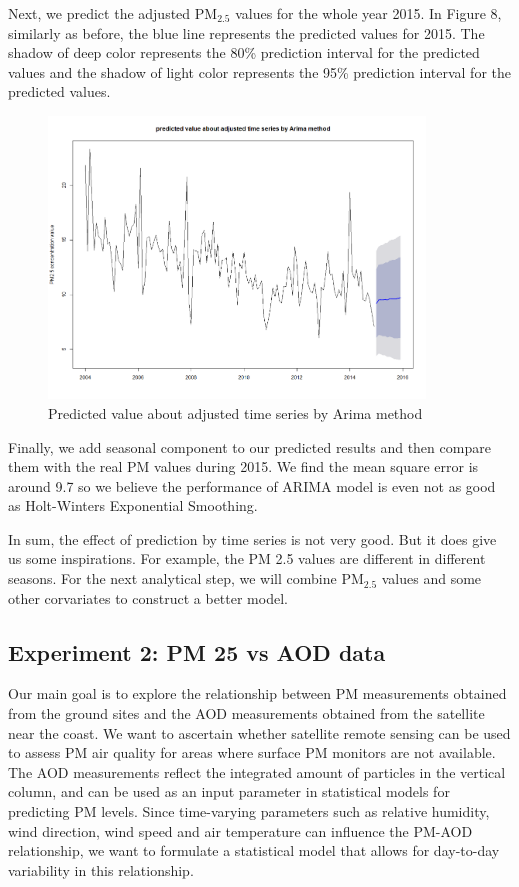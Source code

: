 \documentclass[10pt]{article}
\begin{document}
Next, we predict the adjusted PM$_{2.5}$ values for the whole year 2015. In Figure 8, similarly as before, the blue line represents the predicted values for 2015. The shadow of deep color represents the 80\% prediction interval for the predicted values and the shadow of light color represents the 95\% prediction interval for the predicted values.

\begin{figure}[H]
\centering
\includegraphics[width = 100mm]{ts6.png}
\caption{Predicted value about adjusted time series by Arima method}
\end{figure}

Finally, we add seasonal component to our predicted results and then compare them with the real PM values during 2015. We find the mean square error is around 9.7 so we believe the performance of ARIMA model is even not as good as Holt-Winters Exponential Smoothing.

In sum, the effect of prediction by time series is not very good. But it does give us some inspirations. For example, the PM 2.5 values are different in different seasons. For the next analytical step, we will combine PM$_{2.5}$ values and some other corvariates to construct a better model.

\subsection{Experiment 2: PM 25 vs AOD data}

Our main goal is to explore the relationship between PM measurements obtained from the ground sites and the AOD measurements obtained from the satellite near the coast. We want to ascertain whether satellite remote sensing can be used to assess PM air quality for areas where surface PM  monitors are not available. The AOD measurements reflect the integrated amount of particles in the vertical column, and can be used as an input parameter in statistical models for predicting PM levels. Since time-varying parameters such as relative humidity, wind direction, wind speed and air temperature can influence the PM-AOD relationship, we want to formulate a statistical model that allows for day-to-day variability in this relationship.  
\end{document}
